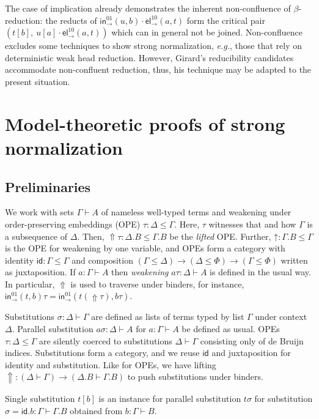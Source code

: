 \documentclass[a4paper,USenglish,cleveref, autoref, thm-restate]{lipics-v2019}
\newcommand{\eg}{\emph{e.g.}\xspace}
\newcommand{\tid}{\mathsf{id}}
\newcommand{\tin}{\ensuremath{\mathsf{in}}}
\newcommand{\inn}[2]{\ensuremath{\tin_{#1}^{#2}}}
\newcommand{\tel}{\mathsf{el}}
\newcommand{\el}[2]{\ensuremath{\tel_{#1}^{#2}}}
\newcommand{\Up}{\mathop{\Uparrow}}
\newcommand{\up}{\mathord{\uparrow}}
\begin{document}
The case of implication already demonstrates the inherent
non-confluence of $\beta$-reduction: the reducts of
$\inn\to{01}(u,b) \cdot \el\to{10}(a,t)$ form the critical pair
$(t[b],\ u[a] \cdot \el\to{10}(a,t))$ which can in general not be
joined.  Non-confluence excludes some techniques to show strong
normalization, \eg, those that rely on deterministic weak head
reduction.  However, Girard's reducibility candidates accommodate
non-confluent reduction, thus, his technique may be adapted to the
present situation.

\section{Model-theoretic proofs of strong normalization}
\label{sec:model}

\subsection{Preliminaries}
\label{sec:prelim}

We work with sets $\Gamma \vdash A$ of nameless well-typed terms and
weakening under order-preserving embeddings (OPE)
$\tau : \Delta \leq \Gamma$.  Here, $\tau$ witnesses that and how
$\Gamma$ is a subsequence of $\Delta$.
Then, $\Up\tau : \Delta.B \leq \Gamma.B$ be the \emph{lifted} OPE.
Further, $\up : \Gamma.B \leq \Gamma$ is the OPE for weakening by one
variable, and OPEs form a category with identity $\tid : \Gamma \leq
\Gamma$ and composition %
$(\Gamma \leq \Delta) \to (\Delta \leq \Phi) \to (\Gamma \leq \Phi)$
written as juxtaposition.
If $a : \Gamma \vdash A$ then
\emph{weakening} $a\tau : \Delta \vdash A$ is defined in the usual way.
In particular, $\Up$ is used to traverse under binders, for instance,
$\inn\to{01}(t,b)\tau = \inn\to{01}(t(\Up\tau),b\tau)$.

Substitutions $\sigma : \Delta \vdash \Gamma$ are defined as lists of
terms typed by list $\Gamma$ under context $\Delta$.  Parallel
substitution $a\sigma : \Delta \vdash A$ for $a : \Gamma \vdash A$ be
defined as usual.  OPEs $\tau : \Delta \leq \Gamma$ are silently
coerced to substitutions $\Delta \vdash \Gamma$ consisting only of de
Bruijn indices.
Substitutions form a category, and we reuse $\tid$ and %
juxtaposition for
identity and substitution.
Like for OPEs, we have lifting
$\Up : (\Delta \vdash \Gamma) \to (\Delta.B \vdash \Gamma.B)$ to push
substitutions under binders.

Single substitution $t[b]$ is
an instance for parallel substitution $t\sigma$ for substitution
$\sigma = \tid.b: \Gamma \vdash \Gamma.B$ obtained from $b : \Gamma \vdash B$.
\end{document}
